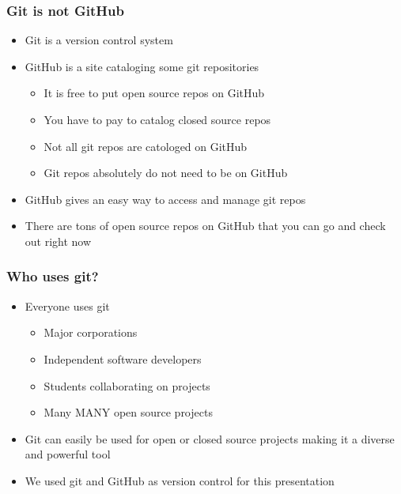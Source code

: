 \documentclass[unknownkeysallowed]{beamer}
\begin{document}
\begin{frame}
\end{frame}

\begin{frame}
    \frametitle{Git is not GitHub}
    \begin{itemize}
    	\item{Git is a version control system}
    	\item{GitHub is a site cataloging some git repositories}
    		\begin{itemize}
    			\item{It is free to put open source repos on GitHub}
    			\item{You have to pay to catalog closed source repos}
    			\item{Not all git repos are catologed on GitHub}
    			\item{Git repos absolutely do not need to be on GitHub}
    		\end{itemize}
    	\item{GitHub gives an easy way to access and manage git repos}
    	\item{There are tons of open source repos on GitHub that you can go and check out right now}
    \end{itemize}
    \vspace{1cm} %
\end{frame}

\begin{frame}
    \frametitle{Who uses git?}
    \begin{itemize}
    	\item{Everyone uses git}
    		\begin{itemize}
    			\item{Major corporations}
    			\item{Independent software developers}
    			\item{Students collaborating on projects}
    			\item{Many MANY open source projects}
    		\end{itemize}
    	\item{Git can easily be used for open or closed source projects making it a diverse and powerful tool}
    	\item{We used git and GitHub as version control for this presentation}
    \end{itemize}
    \vspace{1cm} %
\end{frame}
\end{document}
